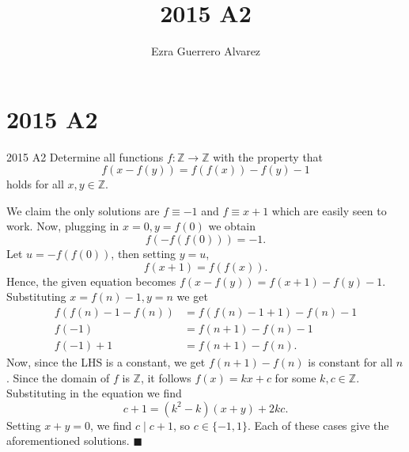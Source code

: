 \documentclass[14pt]{article}
\title{2015 A2}
\author{Ezra Guerrero Alvarez}
\begin{document}
\maketitle
	
\section*{2015 A2}

\begin{statement}{2015 A2}
	Determine all functions $f:\mathbb{Z}\rightarrow\mathbb{Z}$ with the property that
	\[ f(x-f(y))=f(f(x))-f(y)-1 \]
	holds for all $x,y\in\mathbb{Z}$.
\end{statement}
We claim the only solutions are $f\equiv-1$ and $f\equiv x+1$ which are easily seen to work. Now, plugging in $x=0,y=f(0)$ we obtain
\[ f(-f(f(0)))=-1. \]
Let $u=-f(f(0))$, then setting $y=u$,
\[ f(x+1)=f(f(x)). \]
Hence, the given equation becomes $f(x-f(y))=f(x+1)-f(y)-1$. Substituting $x=f(n)-1,y=n$ we get
\begin{align*}
	f(f(n)-1-f(n))&=f(f(n)-1+1)-f(n)-1\\
	f(-1)&=f(n+1)-f(n)-1\\
	f(-1)+1&=f(n+1)-f(n).
\end{align*}
Now, since the LHS is a constant, we get $f(n+1)-f(n)$ is constant for all $n$. Since the domain of $f$ is $\mathbb Z$, it follows $f(x)=kx+c$ for some $k,c\in\mathbb Z$. Substituting in the equation we find
\[ c+1=(k^2-k)(x+y)+2kc. \]
Setting $x+y=0$, we find $c\mid c+1$, so $c\in\{-1,1\}$. Each of these cases give the aforementioned solutions. $\blacksquare$
	
\end{document}
